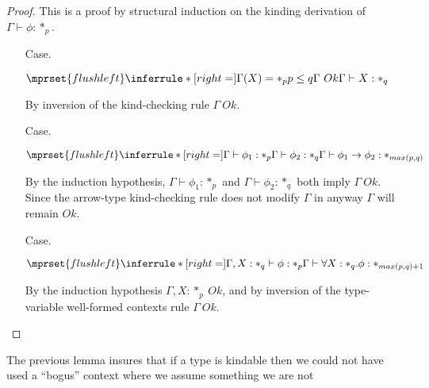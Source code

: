 \begin{proof}
  This is a proof by structural induction on the kinding derivation of $\Gamma \vdash \phi:*_p$.
  \begin{itemize}
  \item[Case.]\ \\
    \begin{center}
      \begin{math}
        $$\mprset{flushleft}
        \inferrule* [right=] {
          \Gamma(X) = *_p
          \\
          p \leq q
          \\
          \Gamma\ Ok
        }{\Gamma \vdash X : *_q}
      \end{math}
    \end{center}
    By inversion of the kind-checking rule $\Gamma\ Ok$.

  \item[Case.]\ \\
    \begin{center}
      \begin{math}
        $$\mprset{flushleft}
        \inferrule* [right=] {
          \Gamma \vdash \phi_1 : *_p
          \\
          \Gamma \vdash \phi_2 : *_q
        }{\Gamma \vdash \phi_1 \rightarrow \phi_2 : *_{max(p,q)}}
      \end{math}
    \end{center}
    By the induction hypothesis, $\Gamma \vdash \phi_1:*_p$ and
    $\Gamma \vdash \phi_2:*_q$ both imply $\Gamma\ Ok$.  Since the
    arrow-type kind-checking rule does not modify $\Gamma$ in anyway
    $\Gamma$ will remain $Ok$.

  \item[Case.]\ \\
    \begin{center}
      \begin{math}
        $$\mprset{flushleft}
        \inferrule* [right=] {
          \Gamma,X : *_q \vdash \phi : *_p
        }{\Gamma \vdash \forall X:*_q.\phi : *_{max(p,q)+1}}
      \end{math}
    \end{center}
    By the induction hypothesis $\Gamma,X:*_p\ Ok$, and by inversion of the type-variable
    well-formed contexts rule $\Gamma\ Ok$.
  \end{itemize}
\end{proof}
\noindent
The previous lemma insures that if a type is kindable then we could
not have used a ``bogus'' context where we assume something we are not
